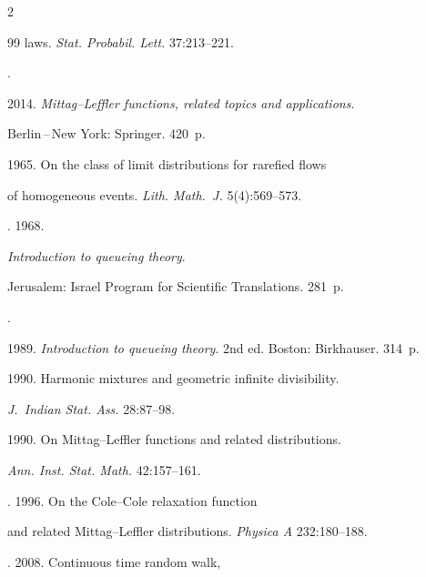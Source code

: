 \begin{multicols}{2}
{{\begin{thebibliography}{99}
laws. \textit{Stat. Probabil. Lett.} 37:213--221.  







. 


2014. \textit{Mittag--Leffler functions, related topics and applications}. 


Berlin\,--\,New York: Springer. 420~p.




 1965. On the class of limit distributions for rarefied flows 


of homogeneous events. \textit{Lith. Math.~J.} 5(4):569--573. 













. 1968. 


\textit{Introduction to queueing theory}. 


Jerusalem: Israel Program for Scientific Translations. 281~p. 




. 


1989. \textit{Introduction to queueing theory}. 2nd ed. Boston: Birkhauser. 314~p.




 1990. Harmonic mixtures and geometric infinite divisibility. 


\textit{J.~Indian Stat. Ass.} 28:87--98. 




 1990. On Mittag--Leffler functions and related distributions. 


\textit{Ann. Inst. Stat. Math.} 42:157--161. 




. 1996. On the Cole--Cole relaxation function 


and related Mittag--Leffler distributions. \textit{Physica A} 232:180--188. 




. 2008. Continuous time random walk, 



\end{thebibliography}}}
\end{multicols}
